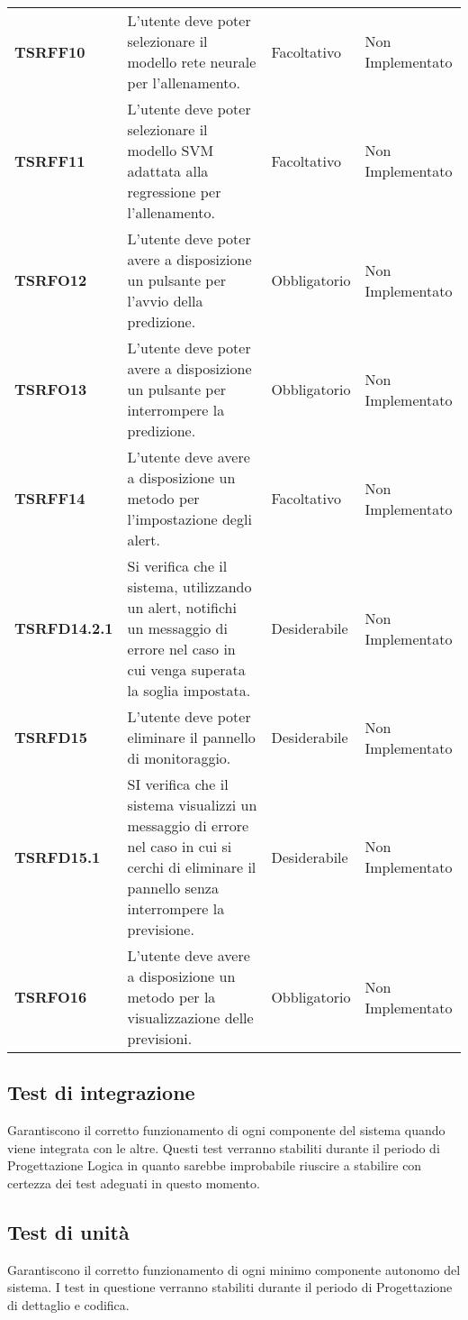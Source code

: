 \documentclass[../piano-di-qualifica.tex]{subfiles}
\begin{document}
\begin{longtable}[H]{>{\centering\bfseries}m{2.5cm} >{\centering}m{7.5cm} >{\centering}m{2.5cm} >{\centering\arraybackslash}m{3.5cm}}
  \textbf{TSRFF10} & L'utente deve poter selezionare il modello rete neurale per l’allenamento. & Facoltativo & Non Implementato \\

  \textbf{TSRFF11} & L'utente deve poter selezionare il modello SVM adattata alla regressione per l’allenamento. & Facoltativo & Non Implementato \\

  \textbf{TSRFO12} & L'utente deve poter avere a disposizione un pulsante per l’avvio della predizione. & Obbligatorio & Non Implementato \\

  \textbf{TSRFO13} & L'utente deve poter avere a disposizione un pulsante per interrompere la predizione. & Obbligatorio & Non Implementato \\

  \textbf{TSRFF14} & L'utente deve avere a disposizione un metodo per l’impostazione degli alert. & Facoltativo & Non Implementato \\

  \textbf{TSRFD14.2.1} & Si verifica che il sistema, utilizzando un alert, notifichi un messaggio di errore nel caso in cui venga superata la soglia impostata. & Desiderabile & Non Implementato \\

  \textbf{TSRFD15} & L'utente deve poter eliminare il pannello di monitoraggio. & Desiderabile & Non Implementato \\

  \textbf{TSRFD15.1} & SI verifica che il sistema visualizzi un messaggio di errore nel caso in cui si cerchi di eliminare il pannello senza interrompere la previsione. & Desiderabile & Non Implementato \\

  \textbf{TSRFO16} & L'utente deve avere a disposizione un metodo per la visualizzazione delle previsioni. & Obbligatorio & Non Implementato \\

\end{longtable}

\subsection{Test di integrazione}
\label{sub:test_di_integrazione}
Garantiscono il corretto funzionamento di ogni componente del sistema quando viene integrata con le altre.
Questi test verranno stabiliti durante il periodo di Progettazione Logica in quanto sarebbe improbabile riuscire a stabilire con certezza dei test adeguati in questo momento.

\subsection{Test di unità}
\label{sub:test_di_unita}
Garantiscono il corretto funzionamento di ogni minimo componente autonomo del sistema.
I test in questione verranno stabiliti durante il periodo di Progettazione di dettaglio e codifica.
\end{document}
